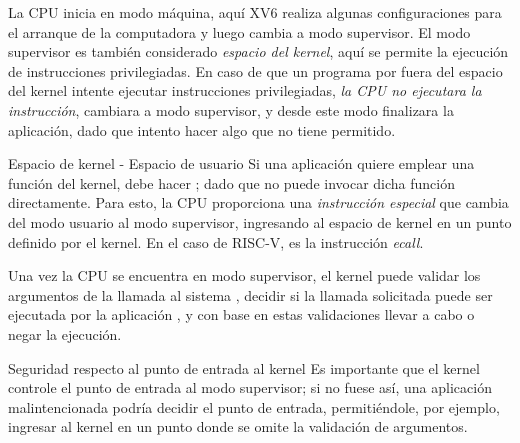 \documentclass{libs/ufc_format}
\begin{document}
\begin{frame}
  La CPU inicia en modo máquina, aquí XV6 realiza algunas configuraciones para el arranque de la computadora  y luego cambia a modo supervisor. \newline \vspace{0.3cm}
  El modo supervisor es también considerado \emph{espacio del kernel}, aquí se permite la ejecución de instrucciones privilegiadas. En caso de que un programa por fuera del espacio del kernel intente ejecutar instrucciones privilegiadas, \emph{la CPU no ejecutara la instrucción}, cambiara a modo supervisor, y desde este modo finalizara la aplicación, dado que intento hacer algo que no tiene permitido.
\end{frame}
\begin{frame}{Espacio de kernel - Espacio de usuario}
  Si una aplicación quiere emplear una función del kernel, debe hacer ; dado que no puede invocar dicha función directamente. Para esto, la CPU proporciona una \emph{instrucción especial} que cambia del modo usuario al modo supervisor, ingresando al espacio de kernel en un punto definido por el kernel. \newline
  En el caso de RISC-V, es la instrucción \emph{ecall}.
\end{frame}
\begin{frame}
  Una vez la CPU se encuentra en modo supervisor, el kernel puede validar los argumentos de la llamada al sistema , decidir si la llamada solicitada puede ser ejecutada por la aplicación , y con base en estas validaciones llevar a cabo o negar la ejecución.

  \begin{block}{Seguridad respecto al punto de entrada al kernel}
    Es importante que el kernel controle el punto de entrada al modo supervisor; si no fuese así, una aplicación malintencionada podría decidir el punto de entrada, permitiéndole, por ejemplo, ingresar al kernel en un punto donde se omite la validación de argumentos.
  \end{block}
\end{frame}
\end{document}
